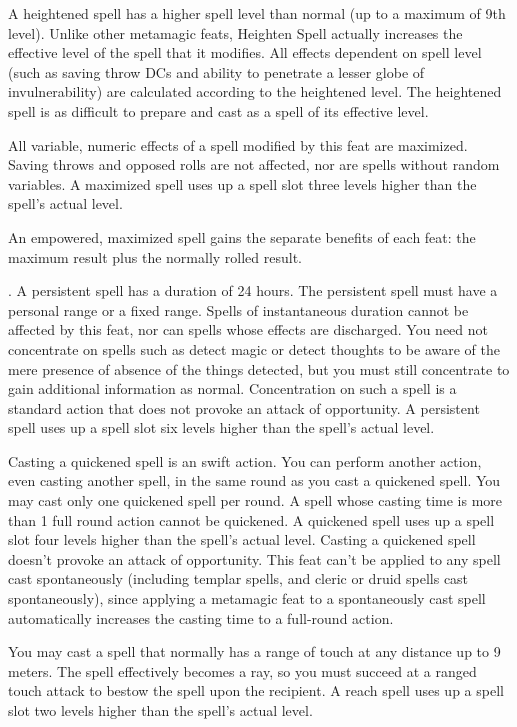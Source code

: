 {A heightened spell has a higher spell level than normal (up to a maximum of 9th level). Unlike other metamagic feats, Heighten Spell actually increases the effective level of the spell that it modifies. All effects dependent on spell level (such as saving throw DCs and ability to penetrate a lesser globe of invulnerability) are calculated according to the heightened level. The heightened spell is as difficult to prepare and cast as a spell of its effective level.}

{All variable, numeric effects of a spell modified by this feat are maximized. Saving throws and opposed rolls are not affected, nor are spells without random variables. A maximized spell uses up a spell slot three levels higher than the spell's actual level.

An empowered, maximized spell gains the separate benefits of each feat: the maximum result plus \onehalf the normally rolled result.}

{.}
{A persistent spell has a duration of 24 hours. The persistent spell must have a personal range or a fixed range. Spells of instantaneous duration cannot be affected by this feat, nor can spells whose effects are discharged. You need not concentrate on spells such as detect magic or detect thoughts to be aware of the mere presence of absence of the things detected, but you must still concentrate to gain additional information as normal. Concentration on such a spell is a standard action that does not provoke an attack of opportunity. A persistent spell uses up a spell slot six levels higher than the spell's actual level.}

{Casting a quickened spell is an swift action. You can perform another action, even casting another spell, in the same round as you cast a quickened spell. You may cast only one quickened spell per round. A spell whose casting time is more than 1 full round action cannot be quickened. A quickened spell uses up a spell slot four levels higher than the spell's actual level. Casting a quickened spell doesn't provoke an attack of opportunity.}
{}
{This feat can't be applied to any spell cast spontaneously (including templar spells, and cleric or druid spells cast spontaneously), since applying a metamagic feat to a spontaneously cast spell automatically increases the casting time to a full-round action.}

{You may cast a spell that normally has a range of touch at any distance up to 9 meters. The spell effectively becomes a ray, so you must succeed at a ranged touch attack to bestow the spell upon the recipient. A reach spell uses up a spell slot two levels higher than the spell's actual level.}

